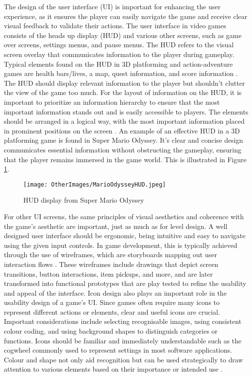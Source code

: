 \documentclass[10pt]{final_report}
\begin{document}
\newline
The design of the user interface (UI) is important for enhancing the user experience, as it ensures the player can easily navigate the game and receive clear visual feedback to validate their actions. The user interface in video games consists of the heads up display (HUD) and various other screens, such as game over screens, settings menus, and pause menus. The HUD refers to the visual screen overlay that communicates information to the player during gameplay. Typical elements found on the HUD in 3D platforming and action-adventure games are health bars/lives, a map, quest information, and score information \cite{Rogers2014}. The HUD should display relevant information to the player but shouldn't clutter the view of the game too much. For the layout of information on the HUD, it is important to prioritize an information hierarchy to ensure that the most important information stands out and is easily accessible to players. The elements should be arranged in a logical way, with the most important information placed in prominent positions on the screen \cite{Hive}. An example of an effective HUD in a 3D platforming game is found in Super Mario Odyssey. It's clear and concise design communicates essential information without obstructing the gameplay, ensuring that the player remains immersed in the game world. This is illustrated in Figure \ref{fig:MarioHUD}.
\begin{figure}[H]
    \centering
    \texttt{[image: OtherImages/MarioOdysseyHUD.jpeg]}
    \caption{HUD display from Super Mario Odyssey}
    \label{fig:MarioHUD}
\end{figure}

For other UI screens, the same principles of visual aesthetics and coherence with the game’s aesthetic are important, just as much as for level design. A well designed user interface should be ergonomic, being intuitive and easy to navigate using the given input controls. In game development, this is typically achieved through the use of wireframes, which are storyboards mapping out user interaction flows \cite{Rogers2014}. These wireframes include drawings that depict screen transitions, button interactions, item pickups, and more, and are later transformed into functional prototypes that are play tested to refine the usability and appeal of the interface.\newline
Icon design also plays an important role in the usability design of a game's UI. Since games often require many icons to represent different actions or elements, clear and useful icons are crucial. Important considerations include selecting recognisable images, using consistent colour coding, and using background shapes to distinguish categories or functions. Icons should be familiar and immediately understandable such as the cogwheel commonly used to represent settings in most software applications. Colour and shape not only aid recognition but can be used strategically to draw attention to various elements based on their importance or intended use \cite{Rogers2014}.
\end{document}
